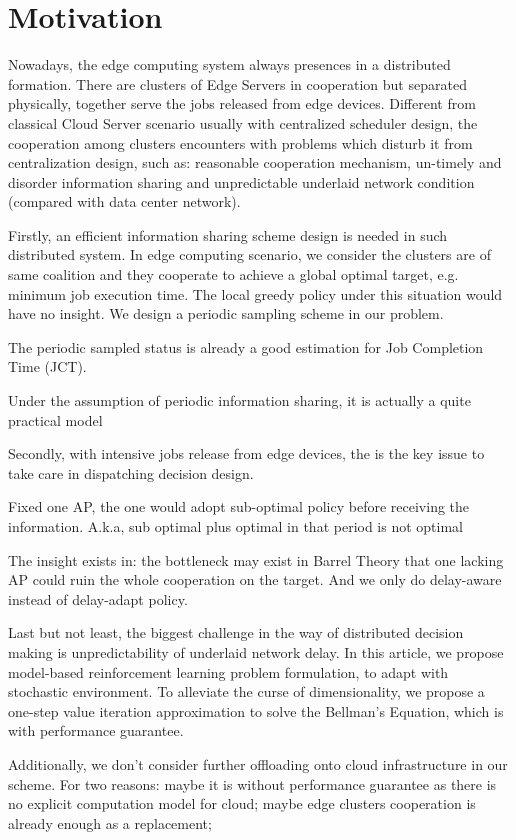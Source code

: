\section{Motivation}
Nowadays, the edge computing system always presences in a distributed formation.
There are clusters of Edge Servers in cooperation but separated physically, together serve the jobs released from edge devices.
Different from classical Cloud Server scenario usually with centralized scheduler design, the cooperation among clusters encounters with problems which disturb it from centralization design, such as: reasonable cooperation mechanism, un-timely and disorder information sharing and unpredictable underlaid network condition (compared with data center network).

Firstly, an efficient information sharing scheme design is needed in such distributed system.
In edge computing scenario, we consider the clusters are of same coalition and they cooperate to achieve a global optimal target, e.g. minimum job execution time.
The local greedy policy under this situation would have no insight.
We design a periodic sampling scheme in our problem.
\begin{example}
    The periodic sampled status is already a good estimation for Job Completion Time (JCT).
\end{example}
Under the assumption of periodic information sharing, it is actually a quite practical model 

Secondly, with intensive jobs release from edge devices, the \brlatency is the key issue to take care in dispatching decision design.
\begin{example}
    Fixed one AP, the one would adopt sub-optimal policy before receiving the information. A.k.a, sub optimal plus optimal in that period is not optimal
\end{example}
The insight exists in: the bottleneck may exist in Barrel Theory that one lacking AP could ruin the whole cooperation on the target.
And we only do delay-aware instead of delay-adapt policy.

Last but not least, the biggest challenge in the way of distributed decision making is unpredictability of underlaid network delay.
In this article, we propose model-based reinforcement learning problem formulation, to adapt with stochastic environment.
To alleviate the curse of dimensionality, we propose a one-step value iteration approximation to solve the Bellman's Equation, which is with performance guarantee.

Additionally, we don't consider further offloading onto cloud infrastructure in our scheme.
For two reasons: maybe it is without performance guarantee as there is no explicit computation model for cloud; maybe edge clusters cooperation is already enough as a replacement; 

